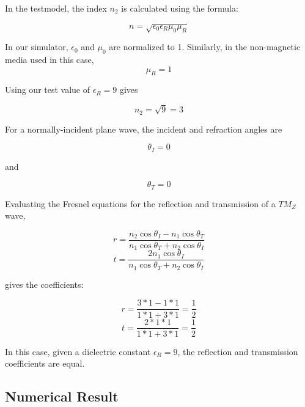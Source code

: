 In the testmodel, the index $n_2$ is calculated using the formula:

\begin{equation}
n = \sqrt{\epsilon_0 \epsilon_R \mu_0 \mu_R}
\end{equation}

In our simulator, $\epsilon_0$ and $\mu_0$ are normalized to 1. Similarly, in the non-magnetic media used in this case, 
\begin{equation}
\mu_R = 1
\end{equation}

Using our test value of $\epsilon_R = 9$ gives 

\begin{equation}
n_2 = \sqrt{9} = 3
\end{equation}

For a normally-incident plane wave, the incident and refraction angles are

\begin{equation}
\theta_I = 0
\end{equation}

and

\begin{equation}
\theta_T = 0
\end{equation}

Evaluating the Fresnel equations for the reflection and transmission of a $TM_Z$ wave,

\begin{equation}
r = \frac{n_2 \cos \theta_I - n_1 \cos \theta_T}{n_1 \cos \theta_T + n_2 \cos \theta_I}
\end{equation}
\begin{equation}
t = \frac{2 n_1 \cos \theta_I}{n_1 \cos \theta_T + n_2 \cos \theta_I}
\end{equation}

gives the coefficients:

\begin{equation}
r = \frac{3 * 1- 1 * 1}{1 * 1 + 3 * 1} = \frac{1}{2}
\end{equation}
\begin{equation}
t = \frac{2 * 1 * 1}{1 * 1 + 3 * 1} = \frac{1}{2}
\end{equation}

In this case, given a dielectric constant $\epsilon_R  = 9$, the reflection and transmission coefficients are equal.

\subsection{Numerical Result}

